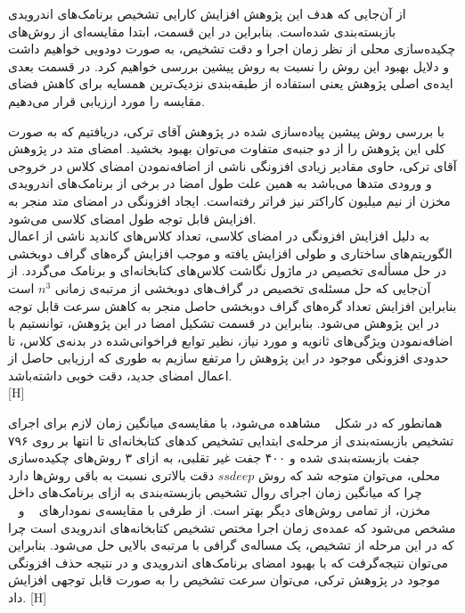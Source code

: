 از آن‌جایی که هدف این پژوهش افزایش کارایی تشخیص برنامک‌های اندرویدی بازبسته‌بندی شده‌است. بنابراین در این قسمت، ابتدا مقایسه‌ای از روش‌های چکیده‌سازی محلی از نظر زمان اجرا و دقت تشخیص، به صورت دودویی خواهیم داشت و دلایل بهبود این روش را نسبت به روش پیشین بررسی خواهیم کرد. در قسمت بعدی ایده‌ی اصلی پژوهش یعنی استفاده از طبقه‌بندی نزدیک‌ترین همسایه برای کاهش فضای مقایسه‌ را مورد ارزیابی قرار می‌دهیم.

\label{pairwisepure}
با بررسی روش پیشین پیاده‌سازی شده در پژوهش آقای ترکی، دریافتیم که به صورت کلی این پژوهش را از دو جنبه‌ی متفاوت می‌توان بهبود بخشید. امضای‌ متد در پژوهش آقای ترکی، حاوی مقادیر زیادی افزونگی ناشی از اضافه‌نمودن امضای کلاس در خروجی و ورودی متد‌ها می‌باشد به همین علت طول امضا در برخی از برنامک‌های اندرویدی مخزن از نیم میلیون کاراکتر نیز فراتر رفته‌است. ایجاد افزونگی در امضای متد منجر به افزایش قابل توجه طول امضای کلاسی می‌شود. \\
به دلیل افزایش افزونگی در امضای کلاسی، تعداد کلاس‌های کاندید ناشی از اعمال الگوریتم‌های ساختاری و طولی افزایش یافته و موجب افزایش گره‌های گراف دوبخشی در حل مسأله‌ی تخصیص در ماژول نگاشت کلاس‌های کتابخانه‌ای و برنامک می‌گردد.  از آن‌جایی که حل مسئله‌ی تخصیص در گراف‌های دوبخشی از مرتبه‌ی زمانی $n^3$
است بنابراین افزایش تعداد گره‌های گراف دوبخشی حاصل منجر به کاهش سرعت قابل توجه در این پژوهش می‌شود. بنابراین در قسمت تشکیل امضا در این پژوهش، توانستیم با اضافه‌نمودن ویژگی‌های ثانویه و مورد نیاز،‌ نظیر توابع فراخوانی‌شده در بدنه‌ی کلاس، تا حدودی افزونگی موجود در این پژوهش را مرتفع سازیم به طوری که ارزیابی حاصل از اعمال امضا‌ی جدید، دقت خوبی داشته‌باشد. \\
 [H]
\vspace{1em}


 همانطور که در شکل ~ مشاهده می‌شود، با مقایسه‌ی میانگین زمان لازم برای اجرای تشخیص بازبسته‌بندی از مرحله‌ی ابتدایی تشخیص کد‌های کتابخانه‌ای تا انتها بر روی ۷۹۶ جفت بازبسته‌بندی شده و ۴۰۰ جفت غیر تقلبی، به ازای ۳ روش‌های چکیده‌سازی محلی، می‌توان متوجه شد که روش $ssdeep$ دقت بالاتری نسبت به باقی روش‌ها دارد چرا که میانگین زمان اجرای روال تشخیص بازبسته‌بندی به ازای برنامک‌های داخل مخزن، از تمامی روش‌های دیگر بهتر است. از طرفی با مقایسه‌ی نمودار‌های ~ و ~ مشخص می‌شود که عمده‌ی زمان اجرا مختص تشخیص کتابخانه‌های اندرویدی است چرا که در این مرحله از تشخیص، یک مساله‌ی گرافی با مرتبه‌ی بالایی حل می‌شود. بنابراین می‌توان نتیجه‌گرفت که با بهبود امضای برنامک‌های اندرویدی و در نتیجه حذف افزونگی موجود در پژوهش ترکی، می‌توان سرعت تشخیص را به صورت قابل توجهی افزایش داد.
  [H]
 \vspace{1em}
 

